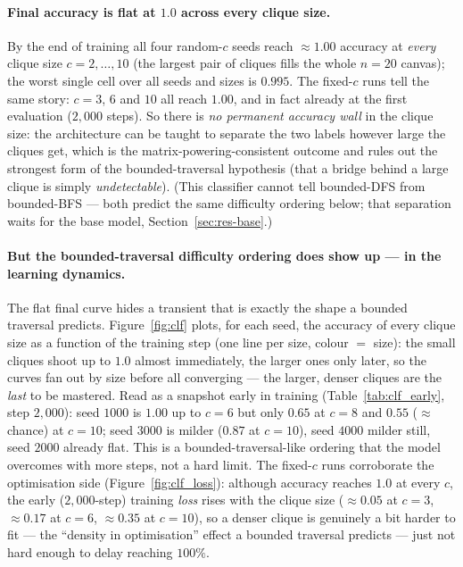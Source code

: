 \documentclass[11pt,a4paper]{article}
\begin{document}
\paragraph{Final accuracy is flat at $1.0$ across every clique size.} By the end of training all
four random-$c$ seeds reach $\approx1.00$ accuracy at \emph{every} clique size $c=2,\dots,10$
(the largest pair of cliques fills the whole $n=20$ canvas); the worst single cell over all
seeds and sizes is $0.995$. The fixed-$c$ runs tell the same story: $c=3$, $6$ and $10$ all reach
$1.00$, and in fact already at the first evaluation ($2{,}000$ steps). So there is \emph{no
permanent accuracy wall} in the clique size: the architecture can be taught to separate the two
labels however large the cliques get, which is the matrix-powering-consistent outcome and rules
out the strongest form of the bounded-traversal hypothesis (that a bridge behind a large clique is
simply \emph{undetectable}). (This classifier cannot tell bounded-DFS from bounded-BFS --- both
predict the same difficulty ordering below; that separation waits for the base model,
Section~\ref{sec:res-base}.)

\paragraph{But the bounded-traversal difficulty ordering does show up --- in the learning
dynamics.} The flat final curve hides a transient that is exactly the shape a bounded traversal
predicts. Figure~\ref{fig:clf} plots,
for each seed, the accuracy of every clique size as a function of the training step (one line per
size, colour $=$ size): the small cliques shoot up to $1.0$ almost immediately, the larger ones
only later, so the curves fan out by size before all converging --- the larger, denser cliques are
the \emph{last} to be mastered. Read as a snapshot early in training
(Table~\ref{tab:clf_early}, step $2{,}000$): seed $1000$ is $1.00$ up to $c=6$ but only $0.65$ at
$c=8$ and $0.55$ ($\approx$ chance) at $c=10$; seed $3000$ is milder ($0.87$ at $c=10$), seed
$4000$ milder still, seed $2000$ already flat. This is a bounded-traversal-like ordering that the
model overcomes with more steps, not a hard limit. The fixed-$c$ runs corroborate the optimisation
side (Figure~\ref{fig:clf_loss}): although accuracy reaches $1.0$ at every $c$, the early
($2{,}000$-step) training \emph{loss} rises with the clique size ($\approx0.05$ at $c=3$,
$\approx0.17$ at $c=6$, $\approx0.35$ at $c=10$), so a denser clique is genuinely a bit harder to
fit --- the ``density in optimisation'' effect a bounded traversal predicts --- just not hard
enough to delay reaching $100\%$.
\end{document}
